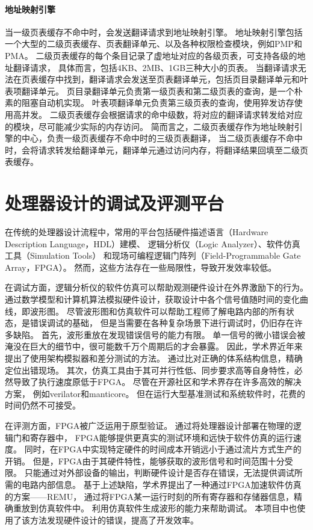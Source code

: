 \paragraph{地址映射引擎} 当一级页表缓存不命中时，会发送翻译请求到地址映射引擎。
地址映射引擎包括一个大型的二级页表缓存、页表翻译单元、以及各种权限检查模块，例如PMP和PMA。
二级页表缓存的每个条目记录了虚地址对应的各级页表，可支持各级的地址翻译请求，
具体而言，包括4KB、2MB、1GB三种大小的页表。
当翻译请求无法在页表缓存中找到，翻译请求会发送至页表翻译单元，包括页目录翻译单元和叶表项翻译单元。
页目录翻译单元负责第一级页表和第二级页表的查询，是一个朴素的阻塞自动机实现。
叶表项翻译单元负责第三级页表的查询，使用猝发访存使用高并发。
二级页表缓存会根据请求的命中级数，将对应的翻译请求转发给对应的模块，尽可能减少实际的内存访问。
简而言之，二级页表缓存作为地址映射引擎的中心，负责一级页表缓存不命中时的三级页表翻译，
当二级页表缓存不命中时，会将请求转发给翻译单元，翻译单元通过访问内存，将翻译结果回填至二级页表缓存。

\section{处理器设计的调试及评测平台}
在传统的处理器设计流程中，常用的平台包括硬件描述语言（Hardware Description Language，HDL）建模、
逻辑分析仪（Logic Analyzer）、软件仿真工具（Simulation Tools）
和现场可编程逻辑门阵列（Field-Programmable Gate Array，FPGA）。
然而，这些方法存在一些局限性，导致开发效率较低。

在调试方面，逻辑分析仪的软件仿真可以帮助观测硬件设计在外界激励下的行为。
通过数学模型和计算机算法模拟硬件设计，获取设计中各个信号值随时间的变化曲线，即波形图。
尽管波形图和仿真软件可以帮助工程师了解电路内部的所有状态，是错误调试的基础，
但是当需要在各种复杂场景下进行调试时，仍旧存在许多缺陷。
首先，波形重放在发现错误信号的能力有限。
单一信号的微小错误会被淹没在巨大的细节中，很可能数千万个周期后的才会暴露。
因此，学术界近年来提出了使用架构模拟器和差分测试的方法\cite{micro2022xiangshan}。
通过比对正确的体系结构信息，精确定位出错现场。
其次，仿真工具由于其可并行性低、同步要求高等自身特性，必然导致了执行速度原低于FPGA。
尽管在开源社区和学术界存在许多高效的解决方案，
例如verilator\cite{github:verilator}和manticore\cite{asplso23manticore}。
但在运行大型基准测试和系统软件时，花费的时间仍然不可接受。

在评测方面，FPGA被广泛运用于原型验证。
通过将处理器设计部署在物理的逻辑门和寄存器中，
FPGA能够提供更真实的测试环境和远快于软件仿真的运行速度。
同时，在FPGA中实现特定硬件的时间成本开销远小于通过流片方式生产的开销。
但是，FPGA由于其硬件特性，能够获取的波形信号和时间范围十分受限。
只能通过对外部设备的输出，判断硬件设计是否存在错误，无法提供调试所需的电路内部信息。
基于上述缺陷，学术界提出了一种通过FPGA加速软件仿真的方案——REMU\cite{iccd2023remu}，
通过将FPGA某一运行时刻的所有寄存器和存储器信息，精确重放到仿真软件中。
利用仿真软件生成波形的能力来帮助调试。
本项目中也使用了该方法发现硬件设计的错误，提高了开发效率。
